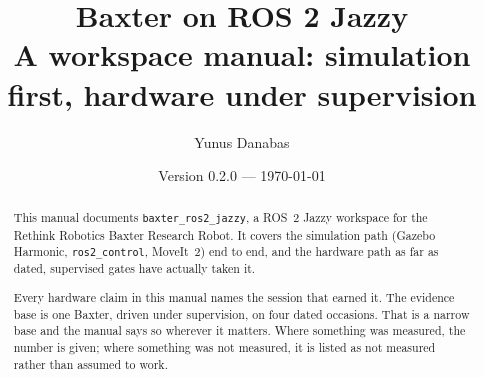 \documentclass[11pt,a4paper,oneside]{report}
\title{\Huge\bfseries Baxter on ROS 2 Jazzy\\[6pt]
  \large A workspace manual: simulation first, hardware under supervision}
\author{Yunus Danabas}
\date{Version 0.2.0 --- \today}
\begin{document}
\maketitle

\begin{abstract}
\noindent
This manual documents \texttt{baxter\_ros2\_jazzy}, a ROS~2 Jazzy workspace for the
Rethink Robotics Baxter Research Robot. It covers the simulation path
(Gazebo Harmonic, \texttt{ros2\_control}, MoveIt~2) end to end, and the hardware
path as far as dated, supervised gates have actually taken it.

Every hardware claim in this manual names the session that earned it. The
evidence base is one Baxter, driven under supervision, on four dated occasions.
That is a narrow base and the manual says so wherever it matters. Where something
was measured, the number is given; where something was not measured, it is listed
as not measured rather than assumed to work.
\end{abstract}

\tableofcontents










\appendix


\end{document}
